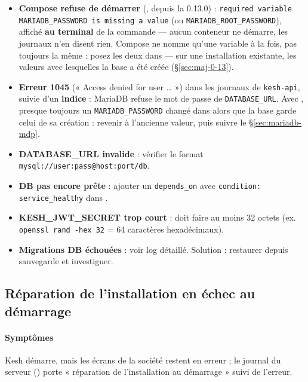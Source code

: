\documentclass[a4paper,11pt,oneside]{article}
\begin{document}
\begin{itemize}
    \item \begin{sloppypar}\textbf{Compose refuse de démarrer} (, depuis la 0.13.0) : \texttt{required variable MARIADB\_PASSWORD is missing a value} (ou \texttt{MARIADB\_ROOT\_PASSWORD}), affiché \textbf{au terminal} de la commande --- aucun conteneur ne démarre, les journaux n'en disent rien. Compose ne nomme qu'une variable à la fois, pas toujours la même : posez les deux dans  --- sur une installation existante, les valeurs avec lesquelles la base a été créée (\S\ref{sec:maj-0-13}).\end{sloppypar}
    \item \textbf{Erreur 1045} (« Access denied for user … ») dans les journaux de \texttt{kesh-api}, suivie d'un \textbf{indice} : MariaDB refuse le mot de passe de \texttt{DATABASE\_URL}. Avec , presque toujours un \texttt{MARIADB\_PASSWORD} changé dans  alors que la base garde celui de sa création : revenir à l'ancienne valeur, puis suivre le \S\ref{sec:mariadb-mdp}.
    \item \textbf{DATABASE\_URL invalide} : vérifier le format \texttt{mysql://user:pass@host:port/db}.
    \item \textbf{DB pas encore prête} : ajouter un \texttt{depends\_on} avec \texttt{condition: service\_healthy} dans .
    \item \textbf{KESH\_JWT\_SECRET trop court} : doit faire au moins 32 octets (ex. \texttt{openssl rand -hex 32} = 64 caractères hexadécimaux).
    \item \textbf{Migrations DB échouées} : voir log détaillé. Solution : restaurer depuis sauvegarde et investiguer.
\end{itemize}

\subsection{Réparation de l'installation en échec au démarrage}

\paragraph{Symptômes} Kesh démarre, mais les écrans de la société restent en erreur ; le journal du serveur () porte « réparation de l'installation au démarrage » suivi de l'erreur.
\end{document}
